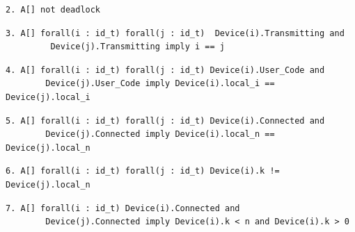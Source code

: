 \begin{lstlisting}[style=UPPAAL, title={The query requires that there is no deadlock in the system.}]
2. A[] not deadlock
\end{lstlisting}

\begin{lstlisting}[style=UPPAAL, title={This requires that if a device \texttt{i}, and a device \texttt{j} are both transmitting, it means they are the same device.}]
3. A[] forall(i : id_t) forall(j : id_t)  Device(i).Transmitting and
		 Device(j).Transmitting imply i == j
\end{lstlisting}
\begin{lstlisting}[style=UPPAAL, title={This query requires that if two devices are both in the location \texttt{User\_Code} they then have the same value of their \texttt{local\_i}}]
4. A[] forall(i : id_t) forall(j : id_t) Device(i).User_Code and 
		Device(j).User_Code imply Device(i).local_i == Device(j).local_i
\end{lstlisting}
\begin{lstlisting}[style=UPPAAL, title={This query requires that if a device \texttt{i} and a device \texttt{j} is both connected, they then have the same value of their \texttt{local\_n}. If they were different it would mean that they are not in the same network, and as such would have different numbers of time-slots in their networks. But the system model makes sure that this is not the case.}]
5. A[] forall(i : id_t) forall(j : id_t) Device(i).Connected and 
		Device(j).Connected imply Device(i).local_n == Device(j).local_n
\end{lstlisting}

\begin{lstlisting}[style=UPPAAL, title={This query requires that if it is always true that all devices never has the the time-slot which one of the devices has locally as the empty-slot. If any device did have this, it would mean that a device was out of sync, since it did not know which time-slot would be the empty one. }]
6. A[] forall(i : id_t) forall(j : id_t) Device(i).k != Device(j).local_n
\end{lstlisting}

\begin{lstlisting}[style=UPPAAL, title={This query says that if a device is connected it has a \texttt{k} value between \texttt{0} and \texttt{n}, which is the number of time-slots in the frame}]
7. A[] forall(i : id_t) Device(i).Connected and 
	 	Device(j).Connected imply Device(i).k < n and Device(i).k > 0
\end{lstlisting}

